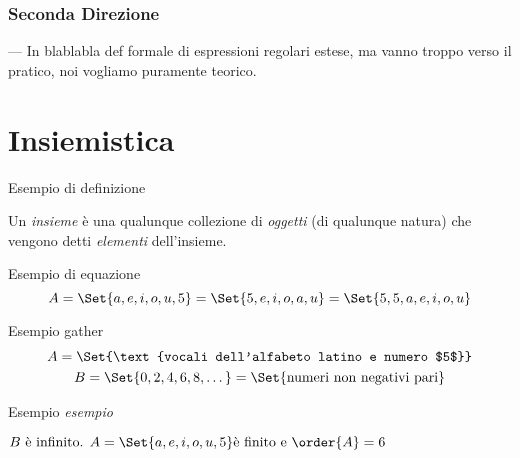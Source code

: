 \subsection{Seconda Direzione}

---
In blablabla def formale di espressioni regolari estese, ma vanno troppo verso il pratico, noi vogliamo puramente teorico.

\chapter{Insiemistica}
Esempio di definizione
\begin{definizione}
	Un \emph{insieme} è una qualunque collezione di \emph{oggetti} (di qualunque natura) che vengono detti \emph{elementi} dell'insieme.
\end{definizione}
Esempio di equazione
\begin{equation*}
	A = \Set{a, e, i, o, u, 5} = \Set{5, e, i, o, a, u} = \Set{5, 5, a, e, i, o, u}
\end{equation*}

Esempio gather
\begin{gather*}
	A = \Set{\text{vocali dell'alfabeto latino e numero $5$}}\\
	B = \Set{0, 2, 4, 6, 8, \dots{}} = \Set{\text{numeri non negativi pari}}
\end{gather*}

Esempio \textit{esempio}
\begin{esempio}
	$B \text{ è infinito. } A = \Set{a, e, i, o, u, 5} \text{è finito e }\order{A} = 6$
\end{esempio}